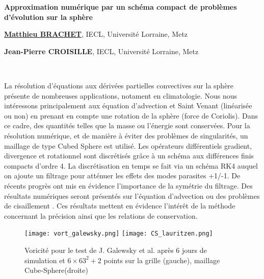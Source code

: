 \documentclass[10pt]{article}
\def\titre#1{\begin{center}{\Large{\bf #1}}\end{center}}
\def\orateur#1#2{\begin{center}{\underline{\large{\bf #1}}}, {#2}\end{center}}
\def\auteur#1#2{\begin{center}{\large{\bf #1}}, {#2}\end{center}}
\def\motscles#1{%
	\ifx#1\IsUndefined\relax\else\noindent{\normalsize{\bf Mots-cl\'es :}} #1\\ \fi}
\begin{document}
\thispagestyle{empty}

\def\Titre{Approximation numérique par un schéma compact de problèmes d'évolution sur la sphère}
\def\NomOrateur{Matthieu BRACHET}
\def\AdresseCourteOrateur{IECL, Universit\'e Lorraine, Metz}
\def\AdresseLongueOrateur{Institut Elie Cartan de Lorraine, UMR 7502, Univ. Lorraine, Metz}
\def\EmailOrateur{email}

\def\NomAuteurI{Jean-Pierre CROISILLE}
\def\AdresseCourteAuteurI{IECL, Universit\'e Lorraine, Metz}
\def\AdresseLongueAuteurI{Institut Elie Cartan de Lorraine, UMR 7502, Univ. Lorraine, Metz}
\def\EmailAuteurI{jean-pierre.croisille@univ-lorraine.fr}

\titre{\Titre}%

\orateur{\NomOrateur}{\AdresseCourteOrateur}
\auteur{\NomAuteurI}{\AdresseCourteAuteurI}

\motscles{\listmotcles}

La résolution d'équations aux dérivées partielles convectives sur la sphère présente de nombreuses applications, notament en climatologie. 
Nous nous intéressons principalement aux équation d'advection et Saint Venant (linéarisée ou non) en prenant en compte une rotation de la sphère (force de Coriolis).
Dans ce cadre, des quantités telles que la masse ou l'énergie sont conservées.
Pour la résolution numérique, et de manière à éviter des problèmes de singularités, un maillage de type Cubed Sphere est utilisé. Les opérateurs différentiels gradient, divergence et rotationnel sont discrétisés grâce à un schéma aux différences finis compacts d'ordre 4. La discrétisation en temps se fait via un schéma RK4 auquel on ajoute un filtrage pour atténuer les effets des modes parasites +1/-1. De récents progrès ont mis en évidence l'importance de la symétrie du filtrage.
Des résultats numériques seront présentés sur l'équation d'advection  \cite{Nair2008} ou des problèmes de cisaillement \cite{Galewsky2004}. Ces résultats mettent en évidence l'intérêt de la méthode concernant la précision ainsi que les relations de conservation.



\begin{figure}[ht]
\begin{center}
\texttt{[image: vort\_galewsky.png]}
\texttt{[image: CS\_lauritzen.png]}
\end{center}
\caption{Voricité pour le test de J. Galewsky et al. \cite{Galewsky2004} après 6 jours de simulation et  $6 \times 63^2 + 2$ points sur la grille (gauche), maillage Cube-Sphere(droite)}
\end{figure}
\end{document}
